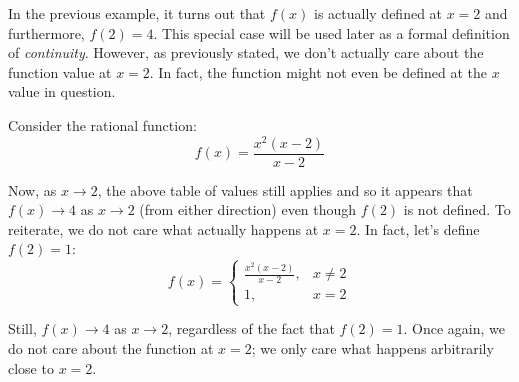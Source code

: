 \documentclass[letterpaper,12pt,fleqn]{article}
\begin{document}
In the previous example, it turns out that \(f(x)\) is actually defined at \(x=2\) and furthermore, \(f(2)=4\).
This special case will be used later as a formal definition of \emph{continuity}.  However, as previously stated,
we don't actually care about the function value at \(x=2\).  In fact, the function might not even be defined at the
\(x\) value in question.

\begin{example}
  Consider the rational function:
  \[f(x)=\frac{x^2(x-2)}{x-2}\]

  \begin{center}
  \end{center}

  \bigskip

  Now, as \(x\to2\), the above table of values still applies and so it appears that \(f(x)\to4\) as \(x\to2\) (from
  either direction) even though \(f(2)\) is not defined.  To reiterate, we do not care what actually happens at
  \(x=2\).  In fact, let's define \(f(2)=1\):
  \[f(x)=\begin{cases}
  \frac{x^2(x-2)}{x-2}, & x\ne2 \\
  1, & x=2
  \end{cases}\]

  \begin{center}
  \end{center}

  \bigskip

  Still, \(f(x)\to4\) as \(x\to2\), regardless of the fact that \(f(2)=1\).  Once again, we do not care about the
  function at \(x=2\); we only care what happens arbitrarily close to \(x=2\).
\end{example}
\end{document}

